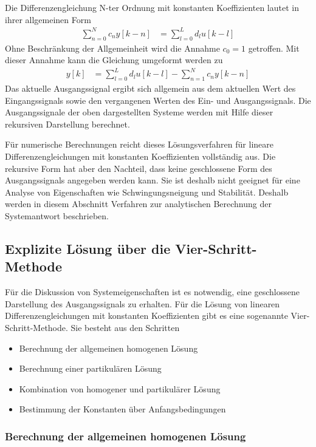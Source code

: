 Die Differenzengleichung N-ter Ordnung mit konstanten Koeffizienten lautet in ihrer allgemeinen Form
\begin{align}
\sum\limits_{n = 0}^{N}{c_{n}  y[ k - n]} &= \sum\limits_{l = 0}^{L}{d_{l}  u[ k - l]} \label{eq:4.45}
\end{align}
Ohne Beschränkung der Allgemeinheit wird die Annahme \(c_{0} = 1\) getroffen. Mit dieser Annahme kann die Gleichung umgeformt werden zu
\begin{align}
y[ k] &= \sum\limits_{l = 0}^{L}{d_{l}  u[ k - l]} - \sum\limits_{n = 1}^{N}{c_{n}  y[ k - n]} \label{eq:4.46}
\end{align}
Das aktuelle Ausgangssignal ergibt sich allgemein aus dem aktuellen Wert des Eingangssignals sowie den vergangenen Werten des Ein- und Ausgangssignals. Die Ausgangssignale der oben dargestellten Systeme werden mit Hilfe dieser rekursiven Darstellung berechnet.

Für numerische Berechnungen reicht dieses Lösungsverfahren für lineare Differenzengleichungen mit konstanten Koeffizienten vollständig aus. Die rekursive Form hat aber den Nachteil, dass keine geschlossene Form des Ausgangssignals angegeben werden kann. Sie ist deshalb nicht geeignet für eine Analyse von Eigenschaften wie Schwingungsneigung und Stabilität. Deshalb werden in diesem Abschnitt Verfahren zur analytischen Berechnung der Systemantwort beschrieben.

\subsection{Explizite Lösung über die Vier-Schritt-Methode}\label{sec:4.3.2}

Für die Diskussion von Systemeigenschaften ist es notwendig, eine geschlossene Darstellung des Ausgangssignals zu erhalten. Für die Lösung von linearen Differenzengleichungen mit konstanten Koeffizienten gibt es eine sogenannte Vier-Schritt-Methode. Sie besteht aus den Schritten

\begin{itemize}
\item
  Berechnung der allgemeinen homogenen Lösung
\item
  Berechnung einer partikulären Lösung
\item
  Kombination von homogener und partikulärer Lösung
\item
  Bestimmung der Konstanten über Anfangsbedingungen
\end{itemize}

\subsubsection{Berechnung der allgemeinen homogenen Lösung}\label{sec:berechnung-der-allgemeinen-homogenen-luxf6sung}

